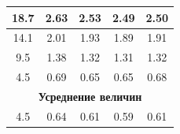 \documentclass[a4paper,12pt]{report}
\begin{document}
\begin{table}[h!]
{\begin{tabular}{|c|c|c|c|c|}
18.7                                                                                            & 2.63                                                                                  & 2.53                                                                                     & 2.49                                                                                  & 2.50                                                                                     \\ \hline
14.1                                                                                            & 2.01                                                                                  & 1.93                                                                                     & 1.89                                                                                  & 1.91                                                                                     \\ \hline
9.5                                                                                             & 1.38                                                                                  & 1.32                                                                                     & 1.31                                                                                  & 1.32                                                                                     \\ \hline
4.5                                                                                             & 0.69                                                                                  & 0.65                                                                                     & 0.65                                                                                  & 0.68                                                                                     \\ \hline
\multicolumn{5}{|c|}{\textbf{Усреднение величин}}                                                                                                                                                                                                                                                                                                                                                                                                                     \\ \hline
4.5                                                                                             & 0.64                                                                                  & 0.61                                                                                     & 0.59                                                                                  & 0.61                                                                                     \\ \hline

\end{tabular}}
\end{table}
\end{document}
